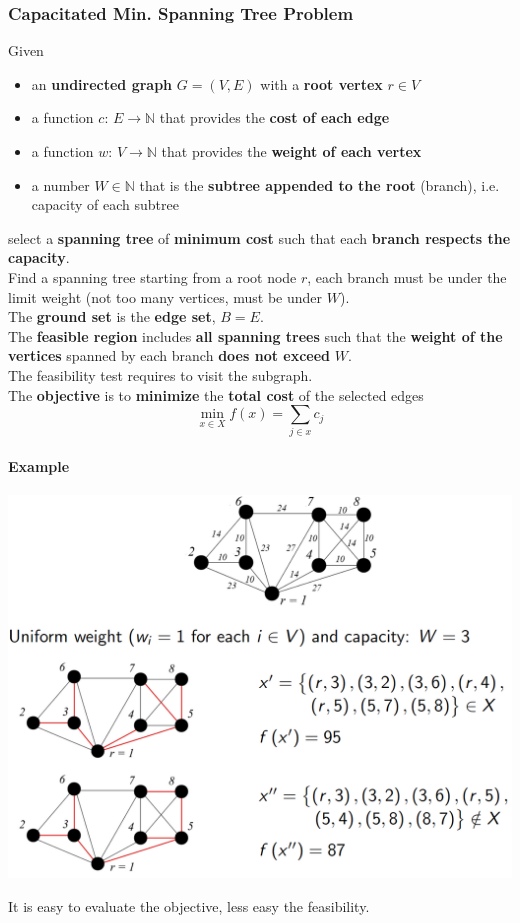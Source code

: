 \documentclass[11pt]{article}
\begin{document}
	\newpage
	
	\subsubsection{Capacitated Min. Spanning Tree Problem}
	Given
	\begin{itemize}
		\item an \textbf{undirected graph} $G = (V , E )$ with a \textbf{root vertex} $r \in V$
		\item a function $c : \, E \rightarrow \mathbb{N}$ that provides the \textbf{cost of each edge}
		\item a function $w : \, V \rightarrow \mathbb{N}$ that provides the \textbf{weight of each vertex}
		\item a number $W \in \mathbb{N}$ that is the \textbf{subtree appended to the root} (branch), i.e. capacity of each subtree
	\end{itemize}
	select a \textbf{spanning tree} of \textbf{minimum cost} such that each \textbf{branch respects the capacity}.\\
	Find a spanning tree starting from a root node $r$, each branch must be under the limit weight (not too many vertices, must be under $W$).\\
	
	The \textbf{ground set} is the \textbf{edge set}, $B = E$.\\
	
	The \textbf{feasible region} includes \textbf{all spanning trees} such that the \textbf{weight of the vertices} spanned by each branch \textbf{does not exceed} $W$.\\
	The feasibility test requires to visit the subgraph.\\
	
	The \textbf{objective} is to \textbf{minimize} the \textbf{total cost} of the selected edges
	$$ \min_{x \in X} f(x) = \sum_{j \in x} c_j $$
	
	\newpage
	
	\paragraph{Example}
	\begin{center}
		\includegraphics[width=0.8\columnwidth]{img/CSTP}
	\end{center}
	It is easy to evaluate the objective, less easy the feasibility.
	
\end{document}
